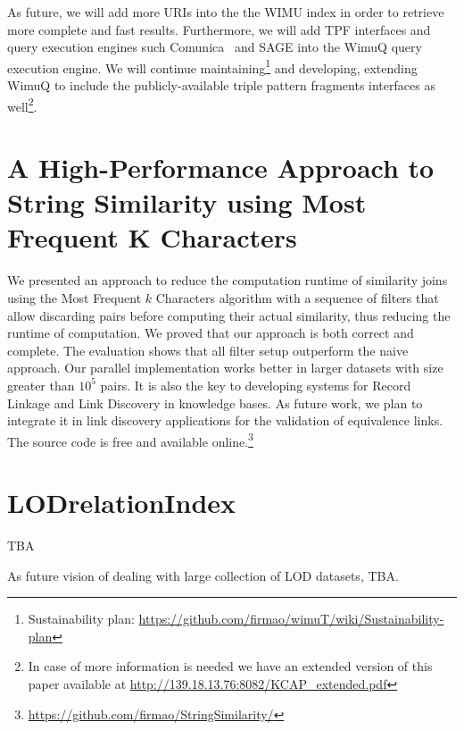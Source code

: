 As future, we will add more URIs into the the WIMU index in order to retrieve more complete and fast results. Furthermore, we will add TPF interfaces and query execution engines such Comunica~\cite{taelman2018comunica} and SAGE \cite{DBLP:journals/corr/abs-1806-00227} into the WimuQ query execution engine. We will continue maintaining\footnote{Sustainability plan: \url{https://github.com/firmao/wimuT/wiki/Sustainability-plan}} and developing, extending WimuQ to include the publicly-available triple pattern fragments interfaces as well\footnote{\label{note1}In case of more information is needed we have an extended version of this paper available at \url{http://139.18.13.76:8082/KCAP_extended.pdf}}.

\section{A High-Performance Approach to String Similarity using Most Frequent K Characters}
We presented an approach to reduce the computation runtime of similarity joins using the Most Frequent $k$ Characters algorithm with a sequence of filters that allow discarding pairs before computing their actual similarity, thus reducing the runtime of computation.
We proved that our approach is both correct and complete. 
The evaluation shows that all filter setup outperform the naive approach. Our parallel implementation works better in larger datasets with size greater than $10^5$ pairs.
It is also the key to developing systems for Record Linkage and Link Discovery in knowledge bases.
As future work, we plan to integrate it in link discovery applications for the validation of equivalence links. The source code is free and available online.\footnote{\url{https://github.com/firmao/StringSimilarity/}}

\section{LODrelationIndex}
TBA

As future vision of dealing with large collection of LOD datasets, TBA.